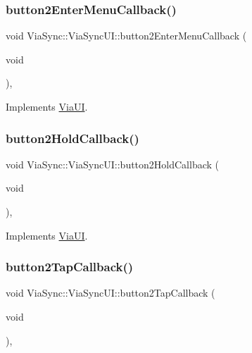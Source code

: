 \subsubsection{\texorpdfstring{button2\+Enter\+Menu\+Callback()}{button2EnterMenuCallback()}}
{\footnotesize\ttfamily void Via\+Sync\+::\+Via\+Sync\+U\+I\+::button2\+Enter\+Menu\+Callback (\begin{DoxyParamCaption}\item[{void}]{ }\end{DoxyParamCaption})\hspace{0.3cm}{\ttfamily [override]}, {\ttfamily [virtual]}}



Implements \mbox{\hyperlink{class_via_u_i_ac7b7f919edba9a640e7009e1f9303a2d}{Via\+UI}}.

\mbox{\label{class_via_sync_1_1_via_sync_u_i_ad3759b21040068b5bf4ad9fd518b1c4c}} 
\subsubsection{\texorpdfstring{button2\+Hold\+Callback()}{button2HoldCallback()}}
{\footnotesize\ttfamily void Via\+Sync\+::\+Via\+Sync\+U\+I\+::button2\+Hold\+Callback (\begin{DoxyParamCaption}\item[{void}]{ }\end{DoxyParamCaption})\hspace{0.3cm}{\ttfamily [override]}, {\ttfamily [virtual]}}



Implements \mbox{\hyperlink{class_via_u_i_a95bce2d662a8ae46be73497e868aebb9}{Via\+UI}}.

\mbox{\label{class_via_sync_1_1_via_sync_u_i_ac1a33313bc6c5c1f07b3a8cb3094a700}} 
\subsubsection{\texorpdfstring{button2\+Tap\+Callback()}{button2TapCallback()}}
{\footnotesize\ttfamily void Via\+Sync\+::\+Via\+Sync\+U\+I\+::button2\+Tap\+Callback (\begin{DoxyParamCaption}\item[{void}]{ }\end{DoxyParamCaption})\hspace{0.3cm}{\ttfamily [override]}, {\ttfamily [virtual]}}



